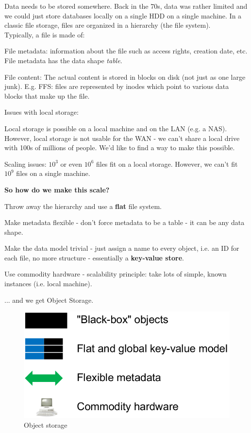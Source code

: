 \documentclass[11pt,oneside,a4paper]{article}
\begin{document}
Data needs to be stored somewhere. Back in the 70s, data was rather limited and we could just store databases locally on a single HDD on a single machine. In a classic file storage, files are organized in a hierarchy (the file system).\\
Typically, a file is made of:

\begin{compactitem}
	\item File metadata: information about the file such as access rights, creation date, etc. File metadata has the data shape \textit{table}.
	\item File content: The actual content is stored in blocks on disk (not just as one large junk). E.g. FFS: files are represented by inodes which point to various data blocks that make up the file.
\end{compactitem}

Issues with local storage:
\begin{compactitem}
	\item Local storage is possible on a local machine and on the LAN (e.g. a NAS). However, local storage is not usable for the WAN - we can't share a local drive with 100s of millions of people. We'd like to find a way to make this possible.
	\item Scaling issues: $10^3$ or even $10^6$ files fit on a local storage. However, we can't fit $10^9$ files on a single machine.\\
\end{compactitem}

\textbf{So how do we make this scale?}

\begin{compactitem}
	\item Throw away the hierarchy and use a \textbf{flat} file system.
	\item Make metadata flexible - don't force metadata to be a table - it can be any data shape.
	\item Make the data model trivial - just assign a name to every object, i.e. an ID for each file, no more structure - essentially a \textbf{key-value store}.
	\item Use commodity hardware - scalability principle: take lots of simple, known instances (i.e. local machine).\\
\end{compactitem}

... and we get Object Storage.\\

\begin{figure}
	\centering
	\includegraphics[width=0.25\linewidth]{figures/object_storage}
	\caption{Object storage}
	\label{fig:objectstorage}
\end{figure}
\end{document}
